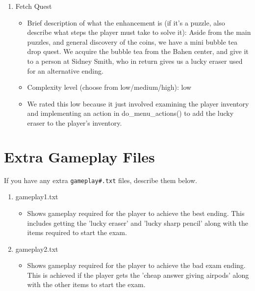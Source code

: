 \documentclass[11pt]{article}
\begin{document}
\begin{enumerate}
\item Fetch Quest
	\begin{itemize}
	\item Brief description of what the enhancement is (if it's a puzzle, also describe what steps the player must take to solve it): Aside from the main puzzles, and general discovery of the coins, we have a mini bubble tea drop quest. We acquire the bubble tea from the Bahen center, and give it to a person at Sidney Smith, who in return gives us a lucky eraser used for an alternative ending.
	\item Complexity level (choose from low/medium/high): low
	\item  We rated this low because it just involved examining the player inventory and implementing an action in do\_menu\_actions() to add the lucky eraser to the player's inventory.
	\end{itemize}
 


\end{enumerate}


\section*{Extra Gameplay Files}

If you have any extra \texttt{gameplay\#.txt} files, describe them below.

\begin{enumerate}

\item gameplay1.txt
	\begin{itemize}
	\item Shows gameplay required for the player to achieve the best ending. This includes getting the 'lucky eraser' and 'lucky sharp pencil' along with the items required to start the exam.
	\end{itemize}

\item gameplay2.txt
	\begin{itemize}
	\item Shows gameplay required for the player to achieve the bad exam ending. This is achieved if the player gets the 'cheap answer giving airpods' along with the other items to start the exam.
	\end{itemize}

\end{enumerate}
\end{document}
